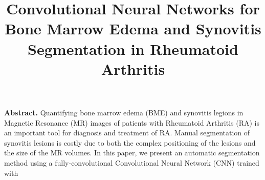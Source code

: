 \documentclass[11pt]{article}
\title{\textbf{Convolutional Neural Networks for Bone Marrow Edema and Synovitis Segmentation in Rheumatoid Arthritis}}
\date{}
\begin{document}
\maketitle

\textbf{Abstract.} Quantifying bone marrow edema (BME) and synovitis legions in Magnetic Resonance (MR) images of patients with Rheumatoid Arthritis (RA) is an important tool for diagnosis and treatment of RA. Manual segmentation of synovitis lesions is costly due to both the complex positioning of the lesions and the size of the MR volumes. In this paper, we present an automatic segmentation method using a fully-convolutional Convolutional Neural Network (CNN) trained with   
\end{document}

